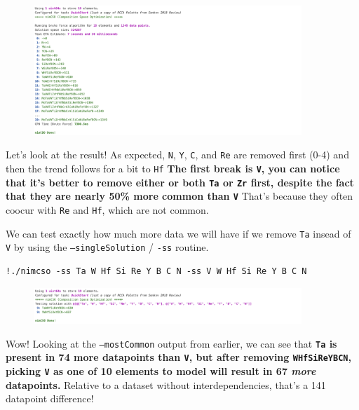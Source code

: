 \begin{figure}[H]
  \centering
  \includegraphics[width=0.9\textwidth]{nimcsotutorial/4.png}
\end{figure}

Let's look at the result! As expected, \texttt{N},
\texttt{Y}, \texttt{C}, and
\texttt{Re} are removed first (0-4) and then the trend
follows for a bit to \texttt{Hf} \textbf{The first
break is \texttt{V}, you can notice that it's better to
remove either or both \texttt{Ta} or
\texttt{Zr} first, despite the fact that they are
nearly 50\% more common than \texttt{V}} That's
because they often coocur with \texttt{Re} and
\texttt{Hf}, which are not common.

We can test exactly how much more data we will have if we remove
\texttt{Ta} insead of \texttt{V} by
using the \texttt{--singleSolution} /
\texttt{-ss} routine.

\begin{verbatim}
!./nimcso -ss Ta W Hf Si Re Y B C N -ss V W Hf Si Re Y B C N
\end{verbatim}

\begin{figure}[H]
  \centering
  \includegraphics[width=0.9\textwidth]{nimcsotutorial/5.png}
\end{figure}

Wow! Looking at the \texttt{--mostCommon} output from
earlier, we can see that \textbf{\texttt{Ta} is present
in 74 more datapoints than \texttt{V}, but after
removing \texttt{WHfSiReYBCN}, picking
\texttt{V} as one of 10 elements to model will result
in 67 \emph{more} datapoints.} Relative to a dataset without
interdependencies, that's a 141 datapoint difference!

